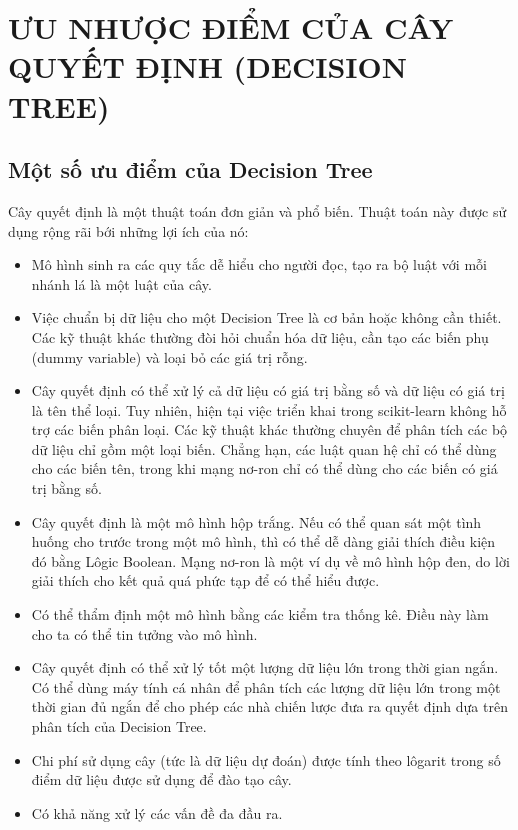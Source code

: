 \chapter{ƯU NHƯỢC ĐIỂM CỦA CÂY QUYẾT ĐỊNH (DECISION TREE)}

\section{Một số ưu điểm của Decision Tree}
Cây quyết định là một thuật toán đơn giản và phổ biến.
Thuật toán này được sử dụng rộng rãi bới những lợi ích của nó:

\begin{itemize}
    \item Mô hình sinh ra các quy tắc dễ hiểu cho người đọc,
    tạo ra bộ luật với mỗi nhánh lá là một luật của cây.
    \item Việc chuẩn bị dữ liệu cho một Decision Tree là cơ bản
    hoặc không cần thiết. Các kỹ thuật khác thường đòi hỏi chuẩn hóa dữ liệu,
    cần tạo các biến phụ (dummy variable) và loại bỏ các giá trị rỗng.
    \item Cây quyết định có thể xử lý cả dữ liệu có giá trị bằng số và
    dữ liệu có giá trị là tên thể loại. Tuy nhiên, hiện tại việc triển khai
    trong scikit-learn không hỗ trợ các biến phân loại. Các kỹ thuật khác
    thường chuyên để phân tích các bộ dữ liệu chỉ gồm một loại biến.
    Chẳng hạn, các luật quan hệ chỉ có thể dùng cho các biến tên,
    trong khi mạng nơ-ron chỉ có thể dùng cho các biến có giá trị bằng số.
    \item Cây quyết định là một mô hình hộp trắng. Nếu có thể quan sát
    một tình huống cho trước trong một mô hình, thì có thể dễ dàng giải thích
    điều kiện đó bằng Lôgic Boolean. Mạng nơ-ron là một ví dụ về mô hình hộp đen,
    do lời giải thích cho kết quả quá phức tạp để có thể hiểu được.
    \item Có thể thẩm định một mô hình bằng các kiểm tra thống kê.
    Điều này làm cho ta có thể tin tưởng vào mô hình.
    \item Cây quyết định có thể xử lý tốt một lượng dữ liệu lớn trong
    thời gian ngắn. Có thể dùng máy tính cá nhân để phân tích các lượng
    dữ liệu lớn trong một thời gian đủ ngắn để cho phép các nhà chiến lược
    đưa ra quyết định dựa trên phân tích của Decision Tree.
    \item Chi phí sử dụng cây (tức là dữ liệu dự đoán) được tính theo lôgarit
    trong số điểm dữ liệu được sử dụng để đào tạo cây.
    \item Có khả năng xử lý các vấn đề đa đầu ra.
\end{itemize}

